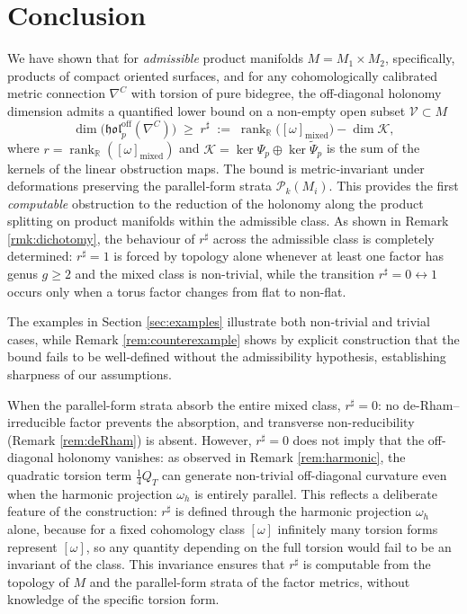 \documentclass[11pt,reqno]{amsart}
\theoremstyle{plain}
\theoremstyle{definition}
\numberwithin{equation}{section}
\begin{document}
\section{Conclusion}
\label{sec:conclusion}

We have shown that for \emph{admissible} product manifolds \(M = M_1 \times M_2\), specifically, products of compact oriented surfaces, and for any cohomologically calibrated metric connection \(\nabla^C\) with torsion of pure bidegree, the off-diagonal holonomy dimension admits a quantified lower bound on a non-empty open subset $\mathcal{V} \subset M$
\[
\dim\bigl(\mathfrak{hol}_p^{\mathrm{off}}(\nabla^{C})\bigr)\;\geq\;
r^\sharp\;:=\;\operatorname{rank}_{\mathbb{R}}\bigl([\omega]_{\mathrm{mixed}}\bigr)-\dim\mathcal{K},
\]
where \(r=\operatorname{rank}_{\mathbb{R}}([\omega]_{\operatorname{mixed}})\) and \(\mathcal{K}=\ker\Psi_p\oplus\ker\widetilde{\Psi}_p\) is the sum of the kernels of the linear obstruction maps. The bound is metric‑invariant under deformations preserving the parallel‑form strata \(\mathcal{P}_k(M_i)\). This provides the first \emph{computable} obstruction to the reduction of the holonomy along the product splitting on product manifolds within the admissible class.
As shown in Remark \ref{rmk:dichotomy}, the behaviour of $r^\sharp$ across the admissible class is completely determined: $r^\sharp=1$ is forced by topology alone whenever at least one factor has genus $g\geq 2$ and the mixed class is non-trivial, while the transition $r^\sharp=0\leftrightarrow 1$ occurs only when a torus factor changes from flat to non-flat.

The examples in Section \ref{sec:examples} illustrate both non‑trivial  and trivial cases, while Remark \ref{rem:counterexample} shows by explicit construction that the bound fails to be well‑defined without the admissibility hypothesis, establishing sharpness of our assumptions.

When the parallel-form strata absorb the entire mixed class, $r^\sharp = 0$: no de-Rham--irreducible factor prevents the absorption, and transverse non-reducibility (Remark \ref{rem:deRham}) is absent. However, $r^\sharp = 0$ does not imply that the off-diagonal holonomy vanishes: as observed in Remark \ref{rem:harmonic}, the quadratic torsion term $\frac{1}{4}Q_T$ can generate non-trivial off-diagonal curvature even when the harmonic projection $\omega_h$ is entirely parallel.
This reflects a deliberate feature of the construction:
$r^\sharp$ is defined through the harmonic projection $\omega_h$ alone, because for a fixed cohomology class $[\omega]$ infinitely many torsion forms represent $[\omega]$, so any quantity depending on the full torsion would fail to be an invariant of the class.
This invariance ensures that $r^\sharp$ is computable from the
topology of $M$ and the parallel-form strata of the factor
metrics, without knowledge of the specific torsion form.
\end{document}
